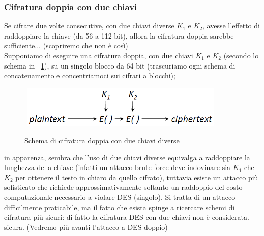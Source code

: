 \subsubsection{Cifratura doppia con due chiavi}
Se cifrare due volte consecutive, con due chiavi diverse $K_{1}$ e $K_{2}$, avesse l'effetto di raddoppiare la chiave (da 56
a 112 bit), allora la cifratura doppia sarebbe sufficiente... (scopriremo che non è così)\\
Supponiamo di eseguire una cifratura doppia, con due chiavi $K_{1}$ e $K_{2}$ (secondo lo schema in \figurename ~\ref{fig:Cif_doppia_dueK}), su un singolo blocco da 64 bit (trascuriamo ogni schema di concatenamento e concentriamoci sui cifrari a blocchi); 
\begin{figure}[htbp]
	\centering%
	\subfigure%
	{\includegraphics[height=2cm, width=10cm, keepaspectratio]{Immagini/Capitolo3/Cif_doppia_dueK.png}}
	\caption{Schema di cifratura doppia con due chiavi diverse \label{fig:Cif_doppia_dueK}} 
\end{figure}
in apparenza, sembra che l'uso di due chiavi diverse equivalga a raddoppiare la lunghezza della chiave (infatti un attacco brute force deve indovinare sia $K_{1}$ che $K_{2}$ per ottenere il testo in chiaro da quello cifrato), tuttavia esiste un attacco più sofisticato che richiede approssimativamente soltanto un raddoppio del costo computazionale necessario a violare DES (singolo). Si tratta di un attacco difficilmente praticabile, ma il fatto che esista spinge a ricercare schemi di cifratura più sicuri: di fatto la cifratura DES con due chiavi non è considerata.
sicura. (Vedremo più avanti l'attacco a DES doppio)
